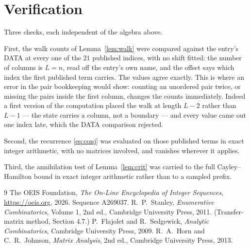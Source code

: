 \documentclass[11pt,a4paper]{article}
\theoremstyle{plain}
\theoremstyle{definition}
\begin{document}
\section{Verification}

Three checks, each independent of the algebra above.

First, the walk counts of Lemma~\ref{lem:walk} were compared against the entry's DATA at
every one of the $21$ published indices, with no shift fitted: the number of columns is
$L=n$, read off the entry's own name, and the offset says which index the first
published term carries. The values agree exactly. This is where an error in the pair
bookkeeping would show: counting an unordered pair twice, or missing the pairs inside the
first column, changes the counts immediately. Indeed a first version of the computation
placed the walk at length $L-2$ rather than $L-1$ --- the state carries a column, not a
boundary --- and every value came out one index late, which the DATA comparison rejected.

Second, the recurrence \eqref{eq:conj} was evaluated on those published terms in exact
integer arithmetic, with no matrices involved, and vanishes wherever it applies.

Third, the annihilation test of Lemma~\ref{lem:crit} was carried to the full
Cayley--Hamilton bound in exact integer arithmetic rather than to a sampled prefix.

\begin{thebibliography}{9}
 The OEIS Foundation, \emph{The On-Line Encyclopedia of Integer
Sequences}, \url{https://oeis.org}, 2026. Sequence A269037.
 R.~P.~Stanley, \emph{Enumerative Combinatorics}, Volume 1, 2nd ed.,
Cambridge University Press, 2011. (Transfer-matrix method, Section 4.7.)
 P.~Flajolet and R.~Sedgewick, \emph{Analytic Combinatorics}, Cambridge
University Press, 2009.
 R.~A.~Horn and C.~R.~Johnson, \emph{Matrix Analysis}, 2nd ed., Cambridge
University Press, 2013.
\end{thebibliography}
\end{document}
